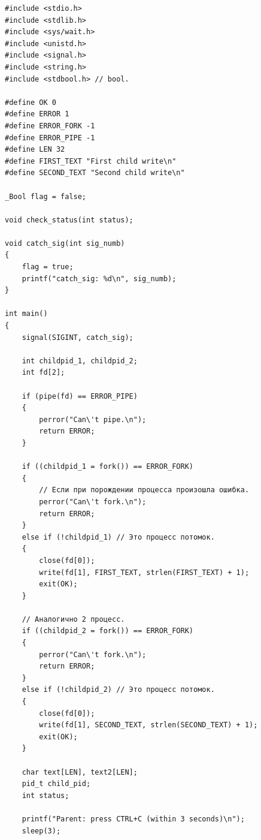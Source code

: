 \begin{figure}[ht!]
\end{figure}

\begin{lstlisting}[label=some-code,caption=Программа 5.]
#include <stdio.h>
#include <stdlib.h>
#include <sys/wait.h>
#include <unistd.h>
#include <signal.h>
#include <string.h>
#include <stdbool.h> // bool.

#define OK 0
#define ERROR 1
#define ERROR_FORK -1
#define ERROR_PIPE -1
#define LEN 32
#define FIRST_TEXT "First child write\n"
#define SECOND_TEXT "Second child write\n"

_Bool flag = false;

void check_status(int status);

void catch_sig(int sig_numb)
{
	flag = true;
	printf("catch_sig: %d\n", sig_numb);
}

int main()
{
	signal(SIGINT, catch_sig);

	int childpid_1, childpid_2;
	int fd[2];

	if (pipe(fd) == ERROR_PIPE)
	{
		perror("Can\'t pipe.\n");
		return ERROR;
	}

	if ((childpid_1 = fork()) == ERROR_FORK)
	{
		// Если при порождении процесса произошла ошибка.
		perror("Can\'t fork.\n");
		return ERROR;
	}
	else if (!childpid_1) // Это процесс потомок.
	{
		close(fd[0]);
		write(fd[1], FIRST_TEXT, strlen(FIRST_TEXT) + 1);
		exit(OK);
	}

	// Аналогично 2 процесс.
	if ((childpid_2 = fork()) == ERROR_FORK)
	{
		perror("Can\'t fork.\n");
		return ERROR;
	}
	else if (!childpid_2) // Это процесс потомок.
	{
		close(fd[0]);
		write(fd[1], SECOND_TEXT, strlen(SECOND_TEXT) + 1);
		exit(OK);
	}

	char text[LEN], text2[LEN];
	pid_t child_pid;
	int status;

	printf("Parent: press CTRL+C (within 3 seconds)\n");
	sleep(3);


\end{lstlisting}
